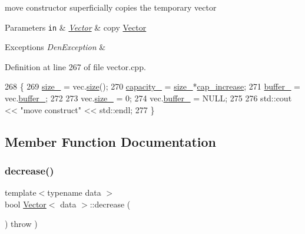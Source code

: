 move constructor  superficially copies the temporary vector 


\begin{DoxyParams}[1]{Parameters}
\mbox{\tt in}  & {\em \hyperlink{classVector}{Vector}} & copy \hyperlink{classVector}{Vector} \\
\hline
\end{DoxyParams}

\begin{DoxyExceptions}{Exceptions}
{\em Den\+Exception} & \\
\hline
\end{DoxyExceptions}


Definition at line 267 of file vector.\+cpp.


\begin{DoxyCode}
268         \{
269             \hyperlink{classVector_a3c70fa478530a90177f2a7e7621ee688}{size\_} = vec.\hyperlink{classVector_a81b1d973485244101caf8e901b4a03d9}{size}();
270             \hyperlink{classVector_ad75911bb39018821f0e2911b6905b7ec}{capacity\_} = \hyperlink{classVector_a3c70fa478530a90177f2a7e7621ee688}{size\_}*\hyperlink{classVector_ae612684de42f3ecdefd867b54d232647}{cap\_increase};
271             \hyperlink{classVector_a22db58ae9e92c6014e8ac657804a035a}{buffer\_} = vec.\hyperlink{classVector_a22db58ae9e92c6014e8ac657804a035a}{buffer\_};
272 
273             vec.\hyperlink{classVector_a3c70fa478530a90177f2a7e7621ee688}{size\_} = 0;
274             vec.\hyperlink{classVector_a22db58ae9e92c6014e8ac657804a035a}{buffer\_} = NULL;
275 
276             std::cout << \textcolor{stringliteral}{"move construct"} << std::endl;
277         \}
\end{DoxyCode}


\subsection{Member Function Documentation}
\mbox{\label{classVector_a770a5b403dcb82ea6954cda918d278d6}} 
\subsubsection{\texorpdfstring{decrease()}{decrease()}}
{\footnotesize\ttfamily template$<$typename data $>$ \\
bool \hyperlink{classVector}{Vector}$<$ data $>$\+::decrease (\begin{DoxyParamCaption}{ }\end{DoxyParamCaption}) throw  ) \hspace{0.3cm}{\ttfamily [private]}}



